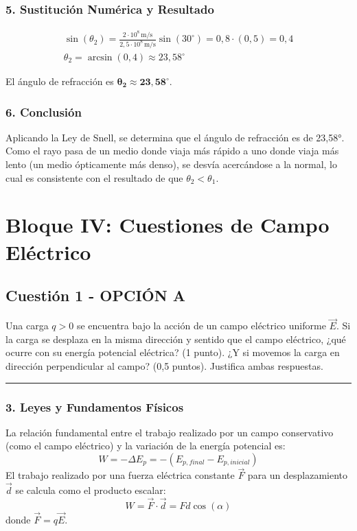 \subsubsection*{5. Sustitución Numérica y Resultado}
\begin{gather}
    \sin(\theta_2) = \frac{2 \cdot 10^8\,\text{m/s}}{2,5 \cdot 10^8\,\text{m/s}} \sin(30^\circ) = 0,8 \cdot (0,5) = 0,4 \\
    \theta_2 = \arcsin(0,4) \approx 23,58^\circ
\end{gather}
\begin{cajaresultado}
    El ángulo de refracción es $\boldsymbol{\theta_2 \approx 23,58^\circ}$.
\end{cajaresultado}

\subsubsection*{6. Conclusión}
\begin{cajaconclusion}
Aplicando la Ley de Snell, se determina que el ángulo de refracción es de 23,58°. Como el rayo pasa de un medio donde viaja más rápido a uno donde viaja más lento (un medio ópticamente más denso), se desvía acercándose a la normal, lo cual es consistente con el resultado de que $\theta_2 < \theta_1$.
\end{cajaconclusion}

\newpage

\section{Bloque IV: Cuestiones de Campo Eléctrico}
\label{sec:elec_2007_jun_ord}

\subsection{Cuestión 1 - OPCIÓN A}
\label{subsec:4A_2007_jun_ord}

\begin{cajaenunciado}
Una carga $q>0$ se encuentra bajo la acción de un campo eléctrico uniforme $\vec{E}$. Si la carga se desplaza en la misma dirección y sentido que el campo eléctrico, ¿qué ocurre con su energía potencial eléctrica? (1 punto). ¿Y si movemos la carga en dirección perpendicular al campo? (0,5 puntos). Justifica ambas respuestas.
\end{cajaenunciado}
\hrule

\subsubsection*{3. Leyes y Fundamentos Físicos}
La relación fundamental entre el trabajo realizado por un campo conservativo (como el campo eléctrico) y la variación de la energía potencial es:
$$ W = -\Delta E_p = -(E_{p,final} - E_{p,inicial}) $$
El trabajo realizado por una fuerza eléctrica constante $\vec{F}$ para un desplazamiento $\vec{d}$ se calcula como el producto escalar:
$$ W = \vec{F} \cdot \vec{d} = Fd\cos(\alpha) $$
donde $\vec{F} = q\vec{E}$.

